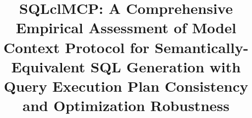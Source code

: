 \documentclass[10pt,conference]{IEEEtran}
\begin{document}
\title{SQLclMCP: A Comprehensive Empirical Assessment of Model Context Protocol for Semantically-Equivalent SQL Generation with Query Execution Plan Consistency and Optimization Robustness}

\author{
}

\maketitle










\balance


\end{document}
